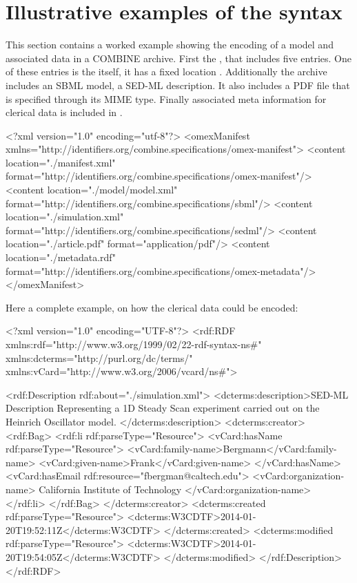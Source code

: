 
\section{Illustrative examples of the syntax}
\label{examples}

This section contains a worked example showing the encoding of a model 
and associated data in a COMBINE archive. First the \OmexManifest, that 
includes five entries. One of these entries is the \OmexManifest itself, 
it has a fixed location . Additionally 
the archive includes an SBML model, a SED-ML description. It also 
includes a PDF file that is specified through its MIME type. Finally 
associated meta information for clerical data is included in 
. 


\begin{example}
<?xml version="1.0" encoding="utf-8"?>
<omexManifest xmlns="http://identifiers.org/combine.specifications/omex-manifest">
    <content location="./manifest.xml" 
		         format="http://identifiers.org/combine.specifications/omex-manifest"/>
    <content location="./model/model.xml" 
		         format="http://identifiers.org/combine.specifications/sbml"/>
    <content location="./simulation.xml" 
		         format="http://identifiers.org/combine.specifications/sedml"/>
    <content location="./article.pdf" 
		         format="application/pdf"/>
    <content location="./metadata.rdf" 
		         format="http://identifiers.org/combine.specifications/omex-metadata"/>
</omexManifest>
\end{example}

Here a complete example, on how the clerical data could be encoded: 

\begin{example}
<?xml version="1.0" encoding="UTF-8"?>
<rdf:RDF xmlns:rdf="http://www.w3.org/1999/02/22-rdf-syntax-ns#" 
         xmlns:dcterms="http://purl.org/dc/terms/" 
				 xmlns:vCard="http://www.w3.org/2006/vcard/ns#">

   <rdf:Description rdf:about="./simulation.xml">
      <dcterms:description>SED-ML Description Representing a 1D Steady Scan 
			   experiment carried out on the Heinrich Oscillator model. 
			</dcterms:description>
      <dcterms:creator>
         <rdf:Bag>
            <rdf:li rdf:parseType="Resource">
               <vCard:hasName rdf:parseType="Resource">
                  <vCard:family-name>Bergmann</vCard:family-name>
                  <vCard:given-name>Frank</vCard:given-name>
               </vCard:hasName>
               <vCard:hasEmail rdf:resource="fbergman@caltech.edu">
               <vCard:organization-name>
		      California Institute of Technology
	       </vCard:organization-name>
            </rdf:li>
         </rdf:Bag>
      </dcterms:creator>
      <dcterms:created rdf:parseType="Resource">
         <dcterms:W3CDTF>2014-01-20T19:52:11Z</dcterms:W3CDTF>
      </dcterms:created>
      <dcterms:modified rdf:parseType="Resource">
         <dcterms:W3CDTF>2014-01-20T19:54:05Z</dcterms:W3CDTF>
      </dcterms:modified>
   </rdf:Description>
</rdf:RDF>
\end{example}